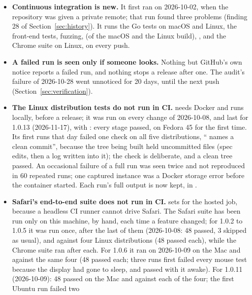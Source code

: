 \begin{itemize}
  \item \label{sec:ci-never-run}\textbf{Continuous integration is new.}  It first ran on
        2026-10-02, when the repository was given a private remote; that run found three
        problems (finding 28 of Section~\ref{sec:history}).  It runs the Go tests on
        macOS and Linux, the front-end tests, fuzzing,  (of the macOS
        and the Linux build), , and the Chrome suite on Linux, on every
        push.
  \item \textbf{A failed run is seen only if someone looks.}  Nothing but GitHub's own
        notice reports a failed run, and nothing stops a release after one.  The audit's
        failure of 2026-10-28 went unnoticed for 20 days, until the next push
        (Section~\ref{sec:verification}).
  \item \textbf{The Linux distribution tests do not run in CI.}  
        needs Docker and runs locally, before a release; it was run on every change of
        2026-10-08, and last for 1.0.13 (2026-11-17), with : every
        stage passed, on Fedora 45 for the first time.  Its first runs that day failed one
        check on all five distributions, `` names a clean commit'', because
        the tree being built held uncommitted files (spec edits, then a log written into
        it); the check is deliberate, and a clean tree passed.  An occasional failure of a full run was seen twice and not
        reproduced in 60 repeated runs; one captured instance was a Docker storage error
        before the container started.  Each run's full output is now kept, in
        .
  \item \textbf{Safari's end-to-end suite does not run in CI.}
         sets  for the hosted job, because a
        headless CI runner cannot drive Safari.  The Safari suite has been run only on
        this machine, by hand, each time a feature changed; for 1.0.2 to 1.0.5 it was
        run once, after the last of them (2026-10-08: 48 passed, 3 skipped as
        usual), and against four Linux distributions (48 passed each), while the Chrome
        suite ran after each.  For 1.0.6 it ran on 2026-10-09 on the Mac and against the
        same four (48 passed each; three runs first failed every mouse test because the
        display had gone to sleep, and passed with it awake).  For 1.0.11 (2026-10-09):
        48 passed on the Mac and against each of the four; the first Ubuntu run failed two

\end{itemize}
